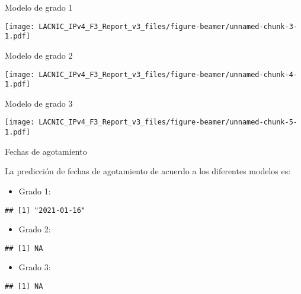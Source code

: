 \documentclass[ignorenonframetext,]{beamer}
\providecommand{\tightlist}{%
  \setlength{\itemsep}{0pt}\setlength{\parskip}{0pt}}
\begin{document}
\begin{frame}{Modelo de grado 1}
\protect\hypertarget{modelo-de-grado-1}{}

\texttt{[image: LACNIC\_IPv4\_F3\_Report\_v3\_files/figure-beamer/unnamed-chunk-3-1.pdf]}

\end{frame}

\begin{frame}{Modelo de grado 2}
\protect\hypertarget{modelo-de-grado-2}{}

\texttt{[image: LACNIC\_IPv4\_F3\_Report\_v3\_files/figure-beamer/unnamed-chunk-4-1.pdf]}

\end{frame}

\begin{frame}{Modelo de grado 3}
\protect\hypertarget{modelo-de-grado-3}{}

\texttt{[image: LACNIC\_IPv4\_F3\_Report\_v3\_files/figure-beamer/unnamed-chunk-5-1.pdf]}

\end{frame}

\begin{frame}[fragile]{Fechas de agotamiento}
\protect\hypertarget{fechas-de-agotamiento}{}

La predicción de fechas de agotamiento de acuerdo a los diferentes
modelos es:

\begin{itemize}
\tightlist
\item
  Grado 1:
\end{itemize}

\begin{verbatim}
## [1] "2021-01-16"
\end{verbatim}

\begin{itemize}
\tightlist
\item
  Grado 2:
\end{itemize}

\begin{verbatim}
## [1] NA
\end{verbatim}

\begin{itemize}
\tightlist
\item
  Grado 3:
\end{itemize}

\begin{verbatim}
## [1] NA
\end{verbatim}

\end{frame}
\end{document}
